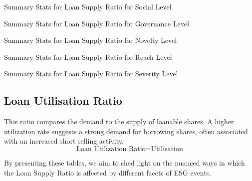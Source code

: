 \begin{table}[H]
\caption{Summary Stats for Loan Supply Ratio for Social Level}
\centering

\label{table:loan_supply_ratio_social.tex}
\end{table}

\begin{table}[H]
\caption{Summary Stats for Loan Supply Ratio for Governance Level}
\centering

\label{table:loan_supply_ratio_governance.tex}
\end{table}


\begin{table}[H]
\caption{Summary Stats for Loan Supply Ratio for Novelty Level}
\centering

\label{table:loan_supply_ratio_novelty.tex}
\end{table}

\begin{table}[H]
\caption{Summary Stats for Loan Supply Ratio for Reach Level}
\centering

\label{table:loan_supply_ratio_reach.tex}
\end{table}

\begin{table}[H]
\caption{Summary Stats for Loan Supply Ratio for Severity Level}
\centering

\label{table:loan_supply_ratio_severity.tex}
\end{table}



\subsection{Loan Utilisation Ratio}

This ratio compares the demand to the supply of loanable shares. A higher utilization rate suggests a strong demand for borrowing shares, often associated with an increased short selling activity.
 \begin{equation}
	\text{Loan Utilization Ratio} = \text{Utilisation}
	\label{eq:Loan_Utilization_Ratio}
\end{equation}

By presenting these tables, we aim to shed light on the nuanced ways in which the Loan Supply Ratio is affected by different facets of ESG events.

